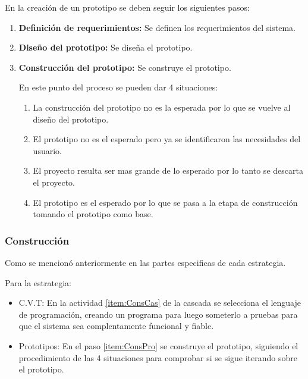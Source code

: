 \documentclass{templateNote}
\begin{document}
\newpage
\noindent En la creación de un prototipo se deben seguir los siguientes pasos:
\begin{enumerate}
    \item \textbf{Definición de requerimientos:} Se definen los requerimientos del sistema.
    
    \item \textbf{Diseño del prototipo:} Se diseña el prototipo.
    
    \item \label{item:ConsPro} \textbf{Construcción del prototipo:} Se construye el prototipo.
    
    En este punto del proceso se pueden dar 4 situaciones:
    
    \begin{enumerate}
        \item La construcción del prototipo no es la esperada por lo que se vuelve al diseño del prototipo.
        
        \item El prototipo no es el esperado pero ya se identificaron las necesidades del usuario.
        
        \item El proyecto resulta ser mas grande de lo esperado por lo tanto se descarta el proyecto.
        
        \item \label{subitem:ImplPro} El prototipo es el esperado por lo que se pasa a la etapa de construcción tomando el prototipo como base.
    \end{enumerate}
\end{enumerate}

\subsubsection{Construcci\'on}
Como se mencion\'o anteriormente en las partes especificas de cada estrategia.

Para la estrategia:
\begin{itemize}
    \item C.V.T: En la actividad \ref{item:ConsCas} de la cascada se selecciona el lenguaje de programaci\'on, creando un programa para luego someterlo a pruebas para que el sistema sea complentamente funcional y fiable.
    \item Prototipos: En el paso \ref{item:ConsPro} se construye el prototipo, siguiendo el procedimiento de las 4 situaciones para comprobar si se sigue iterando sobre el prototipo.
\end{itemize}
\end{document}
